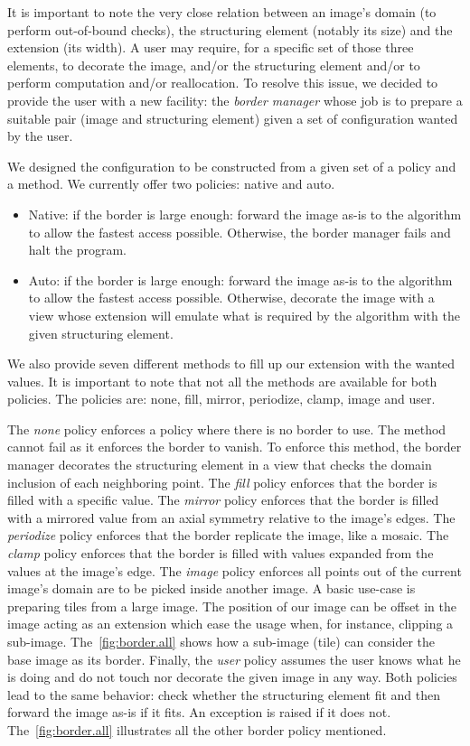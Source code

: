 It is important to note the very close relation between an image's domain (to perform out-of-bound checks), the
structuring element (notably its size) and the extension (its width). A user may require, for a specific set of those
three elements, to decorate the image, and/or the structuring element and/or to perform computation and/or reallocation.
To resolve this issue, we decided to provide the user with a new facility: the \emph{border manager} whose job is to
prepare a suitable pair (image and structuring element) given a set of configuration wanted by the user.

We designed the configuration to be constructed from a given set of a policy and a method. We currently offer two
policies: native and auto.

\begin{itemize}
  \item Native: if the border is large enough: forward the image as-is to the algorithm to allow the fastest access
        possible. Otherwise, the border manager fails and halt the program.
  \item Auto: if the border is large enough: forward the image as-is to the algorithm to allow the fastest access
        possible. Otherwise, decorate the image with a view whose extension will emulate what is required by the
        algorithm with the given structuring element.
\end{itemize}

We also provide seven different methods to fill up our extension with the wanted values. It is important to note that
not all the methods are available for both policies. The policies are: none, fill, mirror, periodize, clamp, image and
user.

The \emph{none} policy enforces a policy where there is no border to use. The method cannot fail as it enforces the
border to vanish. To enforce this method, the border manager decorates the structuring element in a view that checks the
domain inclusion of each neighboring point. The \emph{fill} policy enforces that the border is filled with a specific
value. The \emph{mirror} policy enforces that the border is filled with a mirrored value from an axial symmetry relative
to the image's edges. The \emph{periodize} policy enforces that the border replicate the image, like a mosaic. The
\emph{clamp} policy enforces that the border is filled with values expanded from the values at the image's edge. The
\emph{image} policy enforces all points out of the current image's domain are to be picked inside another image. A basic
use-case is preparing tiles from a large image. The position of our image can be offset in the image acting as an
extension which ease the usage when, for instance, clipping a sub-image. The~\cref{fig:border.all} shows how a sub-image
(tile) can consider the base image as its border. Finally, the \emph{user} policy assumes the user knows what he is
doing and do not touch nor decorate the given image in any way. Both policies lead to the same behavior: check whether
the structuring element fit and then forward the image as-is if it fits. An exception is raised if it does not.
The~\cref{fig:border.all} illustrates all the other border policy mentioned.

